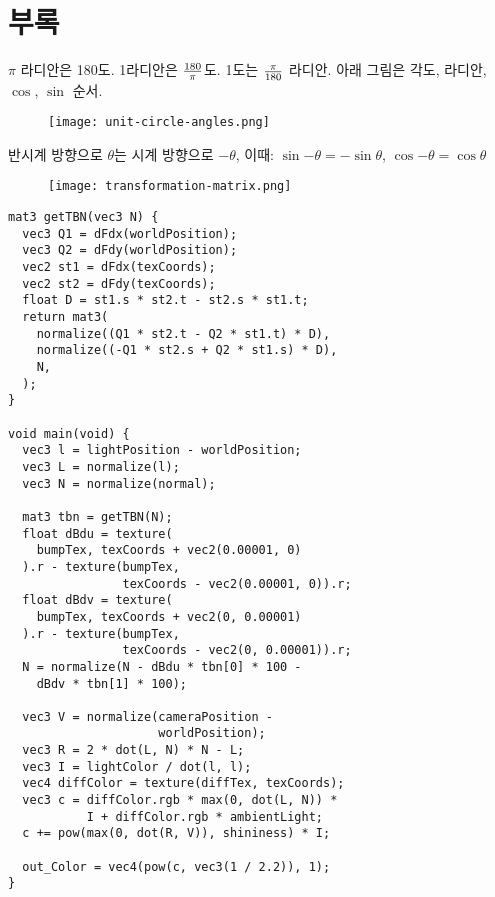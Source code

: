 \section{부록}

$\pi$ 라디안은 180도. 1라디안은 $180 \over \pi$도. 1도는 $\pi \over 180$ 라디안. 아래 그림은 각도, 라디안, $\cos$, $\sin$ 순서.

\begin{figure}[h]
  \centering
  \texttt{[image: unit-circle-angles.png]}
\end{figure}

반시계 방향으로 $\theta$는 시계 방향으로 $-\theta$, 이때: $\sin{-\theta} = -\sin{\theta}$, $\cos{-\theta} = \cos{\theta}$

\begin{figure}[h]
  \centering
  \texttt{[image: transformation-matrix.png]}
\end{figure}

\begin{verbatim}
mat3 getTBN(vec3 N) {
  vec3 Q1 = dFdx(worldPosition);
  vec3 Q2 = dFdy(worldPosition);
  vec2 st1 = dFdx(texCoords);
  vec2 st2 = dFdy(texCoords);
  float D = st1.s * st2.t - st2.s * st1.t;
  return mat3(
    normalize((Q1 * st2.t - Q2 * st1.t) * D),
    normalize((-Q1 * st2.s + Q2 * st1.s) * D),
    N,
  );
}

void main(void) {
  vec3 l = lightPosition - worldPosition;
  vec3 L = normalize(l);
  vec3 N = normalize(normal);

  mat3 tbn = getTBN(N);
  float dBdu = texture(
    bumpTex, texCoords + vec2(0.00001, 0)
  ).r - texture(bumpTex,
                texCoords - vec2(0.00001, 0)).r;
  float dBdv = texture(
    bumpTex, texCoords + vec2(0, 0.00001)
  ).r - texture(bumpTex,
                texCoords - vec2(0, 0.00001)).r;
  N = normalize(N - dBdu * tbn[0] * 100 -
    dBdv * tbn[1] * 100);

  vec3 V = normalize(cameraPosition -
                     worldPosition);
  vec3 R = 2 * dot(L, N) * N - L;
  vec3 I = lightColor / dot(l, l);
  vec4 diffColor = texture(diffTex, texCoords);
  vec3 c = diffColor.rgb * max(0, dot(L, N)) *
           I + diffColor.rgb * ambientLight;
  c += pow(max(0, dot(R, V)), shininess) * I;

  out_Color = vec4(pow(c, vec3(1 / 2.2)), 1);
}
\end{verbatim}
